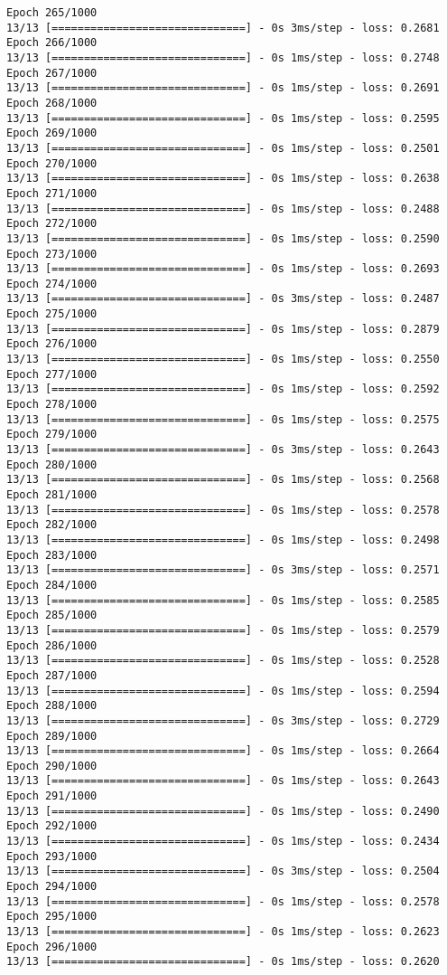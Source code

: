 \documentclass[11pt]{article}
\begin{document}
\begin{Verbatim}[commandchars=\\\{\}]
Epoch 265/1000
13/13 [==============================] - 0s 3ms/step - loss: 0.2681
Epoch 266/1000
13/13 [==============================] - 0s 1ms/step - loss: 0.2748
Epoch 267/1000
13/13 [==============================] - 0s 1ms/step - loss: 0.2691
Epoch 268/1000
13/13 [==============================] - 0s 1ms/step - loss: 0.2595
Epoch 269/1000
13/13 [==============================] - 0s 1ms/step - loss: 0.2501
Epoch 270/1000
13/13 [==============================] - 0s 1ms/step - loss: 0.2638
Epoch 271/1000
13/13 [==============================] - 0s 1ms/step - loss: 0.2488
Epoch 272/1000
13/13 [==============================] - 0s 1ms/step - loss: 0.2590
Epoch 273/1000
13/13 [==============================] - 0s 1ms/step - loss: 0.2693
Epoch 274/1000
13/13 [==============================] - 0s 3ms/step - loss: 0.2487
Epoch 275/1000
13/13 [==============================] - 0s 1ms/step - loss: 0.2879
Epoch 276/1000
13/13 [==============================] - 0s 1ms/step - loss: 0.2550
Epoch 277/1000
13/13 [==============================] - 0s 1ms/step - loss: 0.2592
Epoch 278/1000
13/13 [==============================] - 0s 1ms/step - loss: 0.2575
Epoch 279/1000
13/13 [==============================] - 0s 3ms/step - loss: 0.2643
Epoch 280/1000
13/13 [==============================] - 0s 1ms/step - loss: 0.2568
Epoch 281/1000
13/13 [==============================] - 0s 1ms/step - loss: 0.2578
Epoch 282/1000
13/13 [==============================] - 0s 1ms/step - loss: 0.2498
Epoch 283/1000
13/13 [==============================] - 0s 3ms/step - loss: 0.2571
Epoch 284/1000
13/13 [==============================] - 0s 1ms/step - loss: 0.2585
Epoch 285/1000
13/13 [==============================] - 0s 1ms/step - loss: 0.2579
Epoch 286/1000
13/13 [==============================] - 0s 1ms/step - loss: 0.2528
Epoch 287/1000
13/13 [==============================] - 0s 1ms/step - loss: 0.2594
Epoch 288/1000
13/13 [==============================] - 0s 3ms/step - loss: 0.2729
Epoch 289/1000
13/13 [==============================] - 0s 1ms/step - loss: 0.2664
Epoch 290/1000
13/13 [==============================] - 0s 1ms/step - loss: 0.2643
Epoch 291/1000
13/13 [==============================] - 0s 1ms/step - loss: 0.2490
Epoch 292/1000
13/13 [==============================] - 0s 1ms/step - loss: 0.2434
Epoch 293/1000
13/13 [==============================] - 0s 3ms/step - loss: 0.2504
Epoch 294/1000
13/13 [==============================] - 0s 1ms/step - loss: 0.2578
Epoch 295/1000
13/13 [==============================] - 0s 1ms/step - loss: 0.2623
Epoch 296/1000
13/13 [==============================] - 0s 1ms/step - loss: 0.2620

\end{Verbatim}
\end{document}

